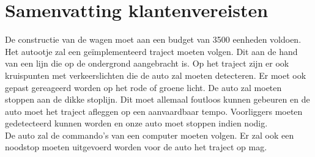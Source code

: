 \documentclass[12pt]{article}
\begin{document}
	

	
	
	\section*{Samenvatting klantenvereisten}
	De constructie van de wagen moet aan een budget van 3500 eenheden voldoen. Het autootje zal een geïmplementeerd traject moeten volgen. Dit aan de hand van een lijn die op de ondergrond aangebracht is. Op het traject zijn er ook kruispunten met verkeerslichten die de auto zal moeten detecteren. Er moet ook gepast gereageerd worden op het rode of groene licht. De auto zal moeten stoppen aan de dikke stoplijn. Dit moet allemaal foutloos kunnen gebeuren en de auto moet het traject afleggen op een aanvaardbaar tempo. Voorliggers moeten gedetecteerd kunnen worden en onze auto moet stoppen indien nodig.  \\
	
	De auto zal de commando's van een computer moeten volgen. Er zal ook een noodstop moeten uitgevoerd worden voor de auto het traject op mag. 
\end{document}
